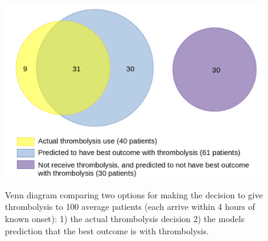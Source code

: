 \begin{figure}
{\includegraphics[width = 5in]{./images/impress_venn_diagram_for_paper.png}}\\ %
\caption{Venn diagram comparing two options for making the decision to give thrombolysis to 100 average patients (each arrive within 4 hours of known onset): 1) the actual thrombolysis decision 2) the models prediction that the best outcome is with thrombolysis.}
\label{fig:venn_actual_best}
\end{figure}

\fi

